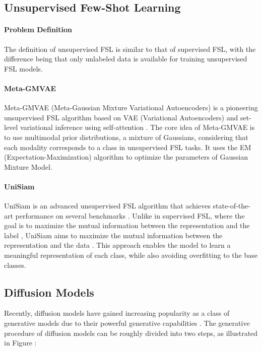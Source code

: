 \documentclass{article}
\begin{document}
\subsection{Unsupervised Few-Shot Learning}


\paragraph{Problem Definition} The definition of unsupervised FSL is similar to that of supervised FSL, with the difference being that only unlabeled data  is available for training unsupervised FSL models.


\paragraph{Meta-GMVAE} Meta-GMVAE (Meta-Gaussian Mixture Variational Autoencoders) \cite{i8} is a pioneering unsupervised FSL algorithm based on VAE (Variational Autoencoders) \cite{i30} and set-level variational inference using self-attention \cite{i31}. The core idea of Meta-GMVAE is to use multimodal prior distributions, a mixture of Gaussians, considering that each modality corresponds to a class in unsupervised FSL tasks. It uses the EM (Expectation-Maximization) algorithm to optimize the parameters of Gaussian Mixture Model. 


\paragraph{UniSiam} UniSiam is an advanced unsupervised FSL algorithm that achieves state-of-the-art performance on several benchmarks \cite{i10}. Unlike in supervised FSL, where the goal is to maximize the mutual information  between the representation  and the label , UniSiam aims to maximize the mutual information  between the representation  and the data . This approach enables the model to learn a meaningful representation of each class, while also avoiding overfitting to the base classes. 


\subsection{Diffusion Models}


Recently, diffusion models have gained increasing popularity as a class of generative models due to their powerful generative capabilities \cite{i21}. The generative procedure of diffusion models can be roughly divided into two steps, as illustrated in Figure \cite{i26}: 
\end{document}
